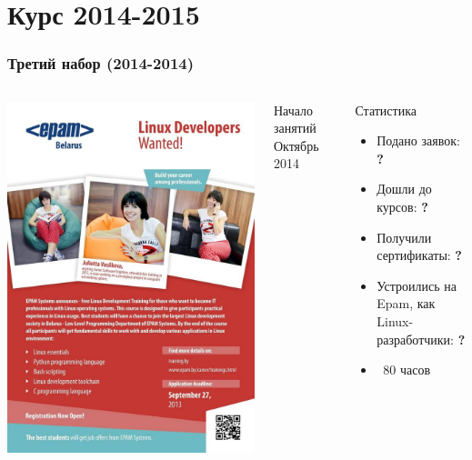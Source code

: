 \section[2014]{Курс 2014-2015}

\begin{frame}
\frametitle{Третий набор (2014-2014)}

  \begin{columns}


	\includegraphics[width=\textwidth]{linux_courses_epam}

	  \begin{block}{Начало занятий}
		  Октябрь 2014
	  \end{block}
	  \begin{block}{Статистика}
		\begin{itemize}	
		  \item Подано заявок: {\bf ?}
		  \item Дошли до курсов: {\bf ?}
  		  \item Получили сертификаты: {\bf ?}
		  \item Устроились на Epam, как Linux-разработчики: {\bf ?}
          \item ~80 часов
		\end{itemize}
	  \end{block}
  \end{columns}
\end{frame}

